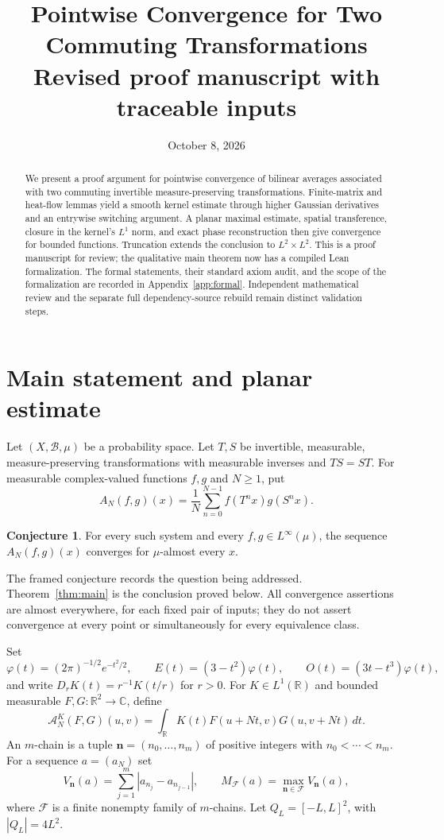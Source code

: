 \documentclass[11pt,a4paper]{article}
\title{Pointwise Convergence for Two\\ Commuting Transformations\\[5pt]
\large Revised proof manuscript with traceable inputs}
\author{}
\date{October 8, 2026}
\theoremstyle{definition}
\newtheorem*{conjecture}{Conjecture}
\newenvironment{statementframe}
  {\par\addvspace{4pt}\noindent
   \setlength{\fboxsep}{6pt}\setlength{\fboxrule}{0.45pt}%
   \begin{lrbox}{\statementbox}%
   \begin{minipage}{\dimexpr\linewidth-2\fboxsep-2\fboxrule\relax}}
  {\end{minipage}\end{lrbox}%
   \fbox{\usebox{\statementbox}}\par\addvspace{4pt}}
\newcommand{\R}{\mathbb R}
\newcommand{\C}{\mathbb C}
\newcommand{\1}{\mathbf1}
\newcommand{\A}{\mathcal A}
\newcommand{\F}{\mathcal F}
\begin{document}
\maketitle
\vspace{-2.4em}
\begin{abstract}
We present a proof argument for pointwise convergence of bilinear
averages associated with two commuting invertible measure-preserving
transformations. Finite-matrix and heat-flow lemmas yield a smooth
kernel estimate through higher Gaussian derivatives and an entrywise
switching argument. A planar maximal estimate, spatial transference,
closure in the kernel's $L^1$ norm, and exact phase reconstruction then
give convergence for bounded functions. Truncation extends the
conclusion to $L^2\times L^2$. This is a proof manuscript for review;
the qualitative main theorem now has a compiled Lean formalization.
The formal statements, their standard axiom audit, and the scope of the
formalization are recorded in Appendix~\ref{app:formal}.
Independent mathematical review and the separate full dependency-source
rebuild remain distinct validation steps.
\end{abstract}

\section{Main statement and planar estimate}

Let $(X,\mathcal B,\mu)$ be a probability space. Let $T,S$ be invertible,
measurable, measure-preserving transformations with measurable inverses
and $TS=ST$. For measurable complex-valued functions $f,g$ and $N\ge1$, put
\[
 A_N(f,g)(x)=\frac1N\sum_{n=0}^{N-1} f(T^nx)g(S^nx).
\]
\begin{statementframe}
\begin{conjecture}
For every such system and every $f,g\in L^\infty(\mu)$, the sequence
$A_N(f,g)(x)$ converges for $\mu$-almost every $x$.
\end{conjecture}
\end{statementframe}
The framed conjecture records the question being addressed.
Theorem~\ref{thm:main} is the conclusion proved below.
All convergence assertions are almost everywhere, for each fixed pair of
inputs; they do not assert convergence at every point or simultaneously
for every equivalence class.

Set
\[
 \varphi(t)=(2\pi)^{-1/2}e^{-t^2/2},\qquad
 E(t)=(3-t^2)\varphi(t),\qquad O(t)=(3t-t^3)\varphi(t),
\]
and write $D_rK(t)=r^{-1}K(t/r)$ for $r>0$. For $K\in L^1(\R)$ and
bounded measurable $F,G:\R^2\to\C$, define
\[
 \A_N^K(F,G)(u,v)=\int_\R K(t)F(u+Nt,v)G(u,v+Nt)\,dt.
\]
An $m$-chain is a tuple $\boldsymbol n=(n_0,\ldots,n_m)$ of positive
integers with $n_0<\cdots<n_m$. For a sequence $a=(a_N)$ set
\[
 V_{\boldsymbol n}(a)=\sum_{j=1}^m |a_{n_j}-a_{n_{j-1}}|,
 \qquad M_{\F}(a)=\max_{\boldsymbol n\in\F}V_{\boldsymbol n}(a),
\]
where $\F$ is a finite nonempty family of $m$-chains. Let
$Q_L=[-L,L]^2$, with $|Q_L|=4L^2$.
\end{document}
